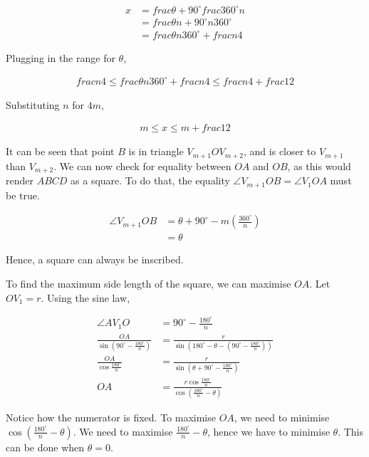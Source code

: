 \documentclass[12pt]{scrartcl}
\begin{document}
\begin{align*}
	 x & = frac{\theta + 90^{\circ}}{frac{360^{\circ}}{n}}   \\
	 & = frac{\theta n + 90^{\circ} n}{360^{\circ}} \\
	 & = frac{\theta n}{360^{\circ}} + frac{n}{4}
\end{align*}

Plugging in the range for $\theta$,

\begin{align*}
	frac{n}{4} \leq frac{\theta n}{360^{\circ}} + frac{n}{4} \leq frac{n}{4} + frac{1}{2}
\end{align*}

Substituting $n$ for $4m$, 

\begin{align*}
	m \leq x \leq m + frac{1}{2}
\end{align*}

It can be seen that point $B$ is in triangle $V_{m+1}OV_{m+2}$, and is closer to $V_{m+1}$ than $V_{m+2}$.
We can now check for equality between $OA$ and $OB$, as this would render $ABCD$ as a square. To do that, the equality $\angle V_{m+1}OB = \angle V_{1}OA$ must be true.

\begin{align*}
	\angle V_{m+1}OB & = \theta + 90^{\circ} - m\left(\frac{360^{\circ}}{n}\right)   \\
	& = \theta
\end{align*}

Hence, a square can always be inscribed.

To find the maximum side length of the square, we can maximise $OA$. Let $OV_{1} = r$.
Using the sine law, 

\begin{align*}
	\angle AV_{1}O & = 90^{\circ} - \frac{180^{\circ}}{n}     \\
	\frac{OA}{\sin \left(90^{\circ} - \frac{180^{\circ}}{n}\right)} & = \frac{r}{\sin \left(180^{\circ} - \theta - \left(90^{\circ} - \frac{180^{\circ}}{n}\right)\right)}  \\
	\frac{OA}{\cos \frac{180^{\circ}}{n}} & = \frac{r}{\sin \left(\theta + 90^{\circ} - \frac{180^{\circ}}{n}\right)}    \\
	OA & = \frac{r \cos \frac{180^{\circ}}{n}}{\cos \left(\frac{180^{\circ}}{n} - \theta\right)}
\end{align*}

Notice how the numerator is fixed. To maximise $OA$, we need to minimise $\cos \left(\frac{180^{\circ}}{n} - \theta\right)$. We need to maximise $\frac{180^{\circ}}{n} - \theta$, hence we have to minimise $\theta$. This can be done when $\theta = 0$.
\end{document}

